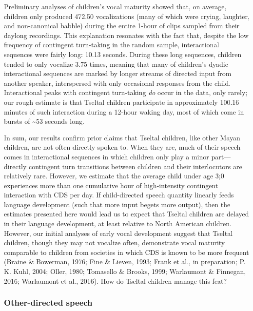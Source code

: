 \documentclass[floatsintext,man]{apa6}
\theoremstyle{definition}
\theoremstyle{definition}
\theoremstyle{definition}
\theoremstyle{remark}
\begin{document}
Preliminary analyses of children's vocal maturity showed that, on
average, children only produced 472.50 vocalizations (many of which were
crying, laughter, and non-canonical babble) during the entire 1-hour of
clips sampled from their daylong recordings. This explanation resonates
with the fact that, despite the low frequency of contingent turn-taking
in the random sample, interactional sequences were fairly long: 10.13
seconds. During these long sequences, children tended to only vocalize
3.75 times, meaning that many of children's dyadic interactional
sequences are marked by longer streams of directed input from another
speaker, interspersed with only occasional responses from the child.
Interactional peaks with contingent turn-taking \emph{do} occur in the
data, only rarely; our rough estimate is that Tseltal children
participate in approximately 100.16 minutes of such interaction during a
12-hour waking day, most of which come in bursts of \textasciitilde{}53
seconds long.

In sum, our results confirm prior claims that Tseltal children, like
other Mayan children, are not often directly spoken to. When they are,
much of their speech comes in interactional sequences in which children
only play a minor part---directly contingent turn transitions between
children and their interlocutors are relatively rare. However, we
estimate that the average child under age 3;0 experiences more than one
cumulative hour of high-intensity contingent interaction with CDS per
day. If child-directed speech quantity linearly feeds language
development (such that more input begets more output), then the
estimates presented here would lead us to expect that Tseltal children
are delayed in their language development, at least relative to North
American children. However, our initial analyses of early vocal
development suggest that Tseltal children, though they may not vocalize
often, demonstrate vocal maturity comparable to children from societies
in which CDS is known to be more frequent (Braine \& Bowerman, 1976;
Fine \& Lieven, 1993; Frank et al., in preparation; P. K. Kuhl, 2004;
Oller, 1980; Tomasello \& Brooks, 1999; Warlaumont \& Finnegan, 2016;
Warlaumont et al., 2016). How do Tseltal children manage this feat?

\subsubsection{Other-directed speech}\label{other-directed-speech}
\end{document}
